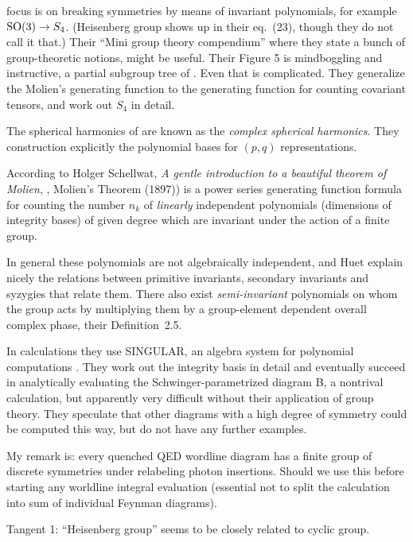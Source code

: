 \begin{description}

 focus is on breaking symmetries by means of invariant
polynomials, for example $\textrm{SO}(3) \to S_4$. (Heisenberg group shows up in their
eq.~(23), though they do not call it that.) Their ``Mini group theory
compendium'' where they state  a bunch of group-theoretic notions, might be
useful. Their Figure 5 is mindboggling and instructive, a partial subgroup  tree
of . Even that is complicated.
They generalize the Molien's generating function  to the
generating  function  for  counting  covariant tensors, and work out $S_4$ in
detail.

The  spherical  harmonics of  are known as the \emph{complex  spherical
harmonics}.
They construction explicitly the polynomial bases for $(p,q)$ representations.

According to Holger Schellwat,
{\em A gentle introduction to a beautiful theorem of {Molien}},
,
Molien's Theorem (1897)) is a power series generating function formula for
counting the number $n_k$ of \emph{linearly} independent polynomials (dimensions of
integrity bases) of given degree which are invariant under the action of a finite
group.

In general these polynomials are not algebraically independent,
and Huet \etal{} explain nicely the relations between primitive invariants,
secondary invariants and syzygies that relate them. There also exist
\emph{semi-invariant} polynomials on whom the group acts by multiplying them by
a group-element dependent overall complex phase, their Definition~2.5.

In calculations they use SINGULAR, an algebra system for polynomial
computations . They work out the  integrity basis in
detail and eventually succeed in analytically evaluating the
Schwinger-parametrized  diagram B, a nontrival calculation, but apparently very
difficult without their application of group theory. They speculate that other
diagrams with a high degree of symmetry could be computed this way, but do not
have any further examples.

My remark is: every quenched QED wordline diagram has a finite group of discrete
symmetries under relabeling photon insertions. Should we use this before starting
any worldline integral evaluation (essential not to split the calculation into
sum of individual Feynman diagrams).

Tangent 1: ``Heisenberg group'' seems to be closely related to cyclic group.


\end{description}
